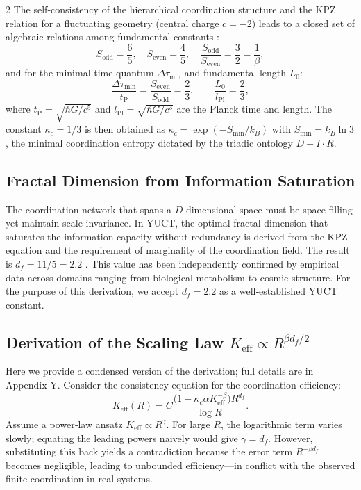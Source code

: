 \documentclass[12pt,a4paper]{article}
\newcommand{\kappac}{\kappa_c}
\newcommand{\Keff}{K_{\mathrm{eff}}}
\newcommand{\betaf}{\beta}
\newcommand{\Lpl}{l_{\mathrm{Pl}}}
\newcommand{\tP}{t_{\mathrm{P}}}
\newcommand{\Sodd}{S_{\mathrm{odd}}}
\newcommand{\Seven}{S_{\mathrm{even}}}
\newcommand{\Dtau}{\Delta\tau_{\min}}
\newcommand{\Lzero}{L_0}
\begin{document}
\begin{multicols}{2}
		The self‑consistency of the hierarchical coordination structure and the KPZ relation for a fluctuating geometry (central charge \(c=-2\)) leads to a closed set of algebraic relations among fundamental constants \cite{AppendixY}:
		\begin{equation}
			\Sodd = \frac{6}{5},\quad \Seven = \frac{4}{5},\quad \frac{\Sodd}{\Seven} = \frac{3}{2} = \frac{1}{\betaf},
		\end{equation}
		and for the minimal time quantum \(\Dtau\) and fundamental length \(\Lzero\):
		\begin{equation}
			\frac{\Dtau}{\tP} = \frac{\Seven}{\Sodd} = \frac{2}{3}, \qquad \frac{\Lzero}{\Lpl} = \frac{2}{3},
			\label{eq:algebraic-loop}
		\end{equation}
		where \(\tP = \sqrt{\hbar G / c^5}\) and \(\Lpl = \sqrt{\hbar G / c^3}\) are the Planck time and length. The constant \(\kappac = 1/3\) is then obtained as \(\kappac = \exp(-S_{\min}/k_B)\) with \(S_{\min} = k_B \ln 3\), the minimal coordination entropy dictated by the triadic ontology \(D + I \cdot R\).
		
		\subsection{Fractal Dimension from Information Saturation}
		
		The coordination network that spans a \(D\)-dimensional space must be space‑filling yet maintain scale‑invariance. In YUCT, the optimal fractal dimension that saturates the information capacity without redundancy is derived from the KPZ equation and the requirement of marginality of the coordination field. The result is \(d_f = 11/5 = 2.2\) \cite{AppendixL}. This value has been independently confirmed by empirical data across domains ranging from biological metabolism to cosmic structure. For the purpose of this derivation, we accept \(d_f = 2.2\) as a well‑established YUCT constant.
		
		\subsection{Derivation of the Scaling Law \(K_{\mathrm{eff}} \propto R^{\beta d_f/2}\)}
		
		Here we provide a condensed version of the derivation; full details are in Appendix Y. Consider the consistency equation for the coordination efficiency:
		\begin{equation}
			\Keff(R) = C \frac{\bigl(1 - \kappac \alpha \Keff^{-\betaf}\bigr) R^{d_f}}{\log R}.
			\label{eq:consistency}
		\end{equation}
		Assume a power‑law ansatz \(\Keff \propto R^{\gamma}\). For large \(R\), the logarithmic term varies slowly; equating the leading powers naively would give \(\gamma = d_f\). However, substituting this back yields a contradiction because the error term \(R^{-\beta d_f}\) becomes negligible, leading to unbounded efficiency—in conflict with the observed finite coordination in real systems.
		

\end{multicols}
\end{document}
